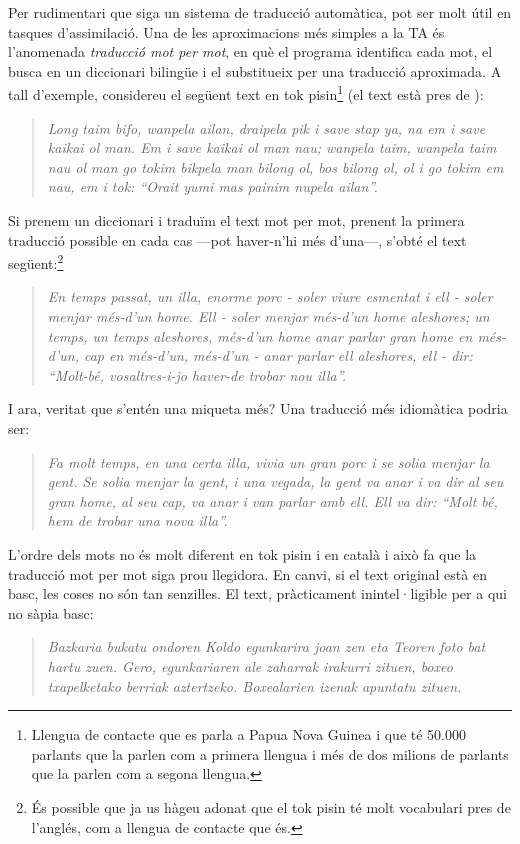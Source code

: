 Per rudimentari que siga un sistema de traducció automàtica, pot ser
molt útil en tasques d'assimilació. Una de les aproximacions més
simples a la TA és l'anomenada \emph{traducció mot per
mot}\label{pg:mpm}, en què el programa
identifica cada mot, el busca en un diccionari bilingüe i el substitueix
per una traducció aproximada. A tall d'exemple, considereu el
següent text en tok pisin\footnote{Llengua 
de contacte que es parla a Papua Nova Guinea i que té 50.000 parlants
que la parlen com a primera llengua i més de dos milions de parlants 
que la parlen com a segona llengua.} (el text està pres de \citealt{lyovin97b}):
\begin{quote}{\sl
Long taim bifo, wanpela ailan, draipela pik i save stap ya, na em i save
kaikai ol man. Em i save kaikai ol man nau; wanpela taim, wanpela taim nau
ol man go tokim bikpela man bilong ol, bos bilong ol, ol i go tokim em nau,
em i tok: ``Orait yumi mas painim nupela ailan''. }
\end{quote} 
Si prenem un diccionari i traduïm el text mot per mot, prenent la
primera traducció possible en cada cas ---pot haver-n'hi més d'una---,
s'obté el text següent:\footnote{És possible que ja us hàgeu
adonat que el tok pisin té molt vocabulari pres de l'anglés, com a
llengua de contacte que és.}
\begin{quote}{\sl
En temps passat, un illa, enorme porc - soler viure esmentat i ell - soler menjar
més-d'un home. Ell - soler menjar més-d'un home aleshores; un temps,
un temps aleshores, més-d'un home anar parlar gran home en més-d'un,
cap en més-d'un,
més-d'un - anar parlar ell aleshores, ell - dir: ``Molt-bé,
vosaltres-i-jo haver-de trobar nou illa''.}
\end{quote}
I ara, veritat que s'entén una miqueta més? Una traducció
més idiomàtica podria ser:
\begin{quote}{\sl
Fa molt temps, en una certa illa, vivia un gran porc i se solia menjar la
gent. Se solia menjar la gent, i una vegada, la gent va anar i va dir al seu
gran home, al seu cap, va anar i van parlar amb ell. Ell va dir: ``Molt
bé, hem de trobar una nova illa''.}
\end{quote}
L'ordre dels mots no és molt diferent en tok
pisin i en català i això fa que la traducció mot per mot siga
prou llegidora. En canvi, si el text original està en basc,
les coses no són
tan senzilles. El text, pràcticament inintel·ligible per a qui no sàpia
basc:
\begin{quote}{\sl
Bazkaria bukatu ondoren Koldo egunkarira joan zen eta Teoren foto bat
hartu zuen. Gero, egunkariaren ale zaharrak irakurri zituen, boxeo
txapelketako berriak aztertzeko. Boxealarien izenak apuntatu zituen.}
\end{quote}
